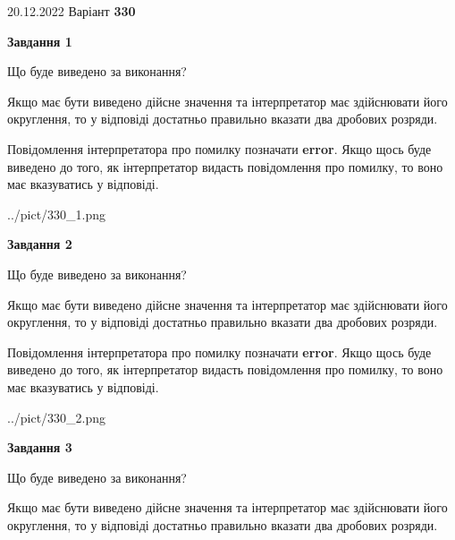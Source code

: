 \documentclass[12pt, ukrainian]{article}
\begin{document}
{20.12.2022 Варіант \No \textbf { 330 }\par}
{
\begin {Large}

{\begin {center}\textbf{Завдання 1}\end {center}}\par
Що буде виведено за виконання? \par

Якщо має бути виведено дійсне значення та інтерпретатор має здійснювати його округлення, 
то у відповіді достатньо правильно вказати два дробових розряди.

Повідомлення інтерпретатора про помилку позначати \textbf{error}.
Якщо щось буде виведено до того, як інтерпретатор видасть повідомлення про помилку, 
то воно має вказуватись у відповіді. \par

\begin{center}
	{../pict/330_1.png}
\end{center}
\newpage

{\begin {center}\textbf{Завдання 2}\end {center}}\par
Що буде виведено за виконання? \par

Якщо має бути виведено дійсне значення та інтерпретатор має здійснювати його округлення, 
то у відповіді достатньо правильно вказати два дробових розряди.

Повідомлення інтерпретатора про помилку позначати \textbf{error}.
Якщо щось буде виведено до того, як інтерпретатор видасть повідомлення про помилку, 
то воно має вказуватись у відповіді. \par

\begin{center}
	{../pict/330_2.png}
\end{center}
\newpage

{\begin {center}\textbf{Завдання 3}\end {center}}\par
Що буде виведено за виконання? \par

Якщо має бути виведено дійсне значення та інтерпретатор має здійснювати його округлення, 
то у відповіді достатньо правильно вказати два дробових розряди.


\end{Large}}
\end{document}
